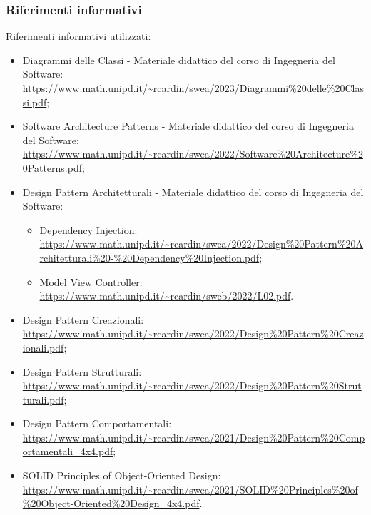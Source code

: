 \subsubsection{Riferimenti informativi}
Riferimenti informativi utilizzati:
\begin{itemize}
	\item Diagrammi delle Classi - Materiale didattico del corso di Ingegneria del Software: \\
		\url{https://www.math.unipd.it/~rcardin/swea/2023/Diagrammi\%20delle\%20Classi.pdf};
	\item Software Architecture Patterns - Materiale didattico del corso di Ingegneria del Software: \\
		\url{https://www.math.unipd.it/~rcardin/swea/2022/Software\%20Architecture\%20Patterns.pdf};
	\item Design Pattern Architetturali - Materiale didattico del corso di Ingegneria del Software: 
	\begin{itemize}
		\item Dependency Injection: 
		\url{https://www.math.unipd.it/~rcardin/swea/2022/Design\%20Pattern\%20Architetturali\%20-\%20Dependency\%20Injection.pdf};
		\item Model View Controller:
		\url{https://www.math.unipd.it/~rcardin/sweb/2022/L02.pdf}.
	\end{itemize}
	\item Design Pattern Creazionali:\\
		\url{https://www.math.unipd.it/~rcardin/swea/2022/Design\%20Pattern\%20Creazionali.pdf};
	\item Design Pattern Strutturali:\\
		\url{https://www.math.unipd.it/~rcardin/swea/2022/Design\%20Pattern\%20Strutturali.pdf};
	\item Design Pattern Comportamentali:\\
		\url{https://www.math.unipd.it/~rcardin/swea/2021/Design\%20Pattern\%20Comportamentali_4x4.pdf};
	\item SOLID Principles of Object-Oriented Design:\\
		\url{https://www.math.unipd.it/~rcardin/swea/2021/SOLID\%20Principles\%20of\%20Object-Oriented\%20Design_4x4.pdf}.
\end{itemize}

